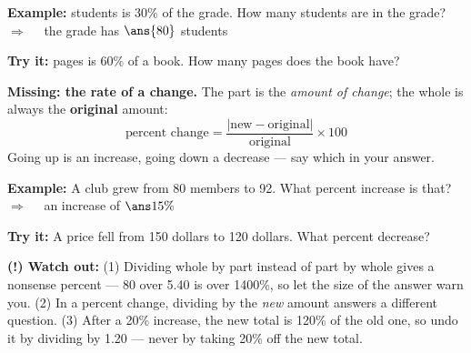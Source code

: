 \documentclass[12pt]{article}
\begin{document}
\begin{examplebox}
\textbf{Example:}  students is 30\% of the grade. How many students are in the grade?
$\Rightarrow\quad$ the grade has $\ans{80}$ students
\end{examplebox}

\begin{tryitbox}
\textbf{Try it:}  pages is 60\% of a book. How many pages does the book have?\\[2pt]
\end{tryitbox}


\begin{formulabox}
\textbf{Missing: the rate of a change.} The part is the \emph{amount of change}; the whole
is always the \textbf{original} amount:
\[ \text{percent change} = \frac{|\text{new} - \text{original}|}{\text{original}} \times 100 \]
Going up is an increase, going down a decrease --- say which in your answer.
\end{formulabox}

\begin{examplebox}
\textbf{Example:} \quad A club grew from 80 members to 92. What percent increase is that?
$\Rightarrow\quad$ an increase of $\ans{15\%}$
\end{examplebox}

\begin{tryitbox}
\textbf{Try it:} \quad A price fell from 150 dollars to 120 dollars. What percent decrease?\\[2pt]
\end{tryitbox}

\begin{watchoutbox}
\textbf{(!) Watch out:} (1) Dividing whole by part instead of part by whole gives a
nonsense percent --- 80 over 5.40 is over 1400\%, so let the size of the answer warn you.
(2) In a percent change, dividing by the \emph{new} amount answers a different question.
(3) After a 20\% increase, the new total is 120\% of the old one, so undo it by dividing by
1.20 --- never by taking 20\% off the new total.
\end{watchoutbox}
\end{document}
